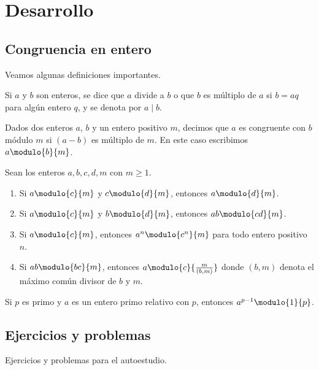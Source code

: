 \section{Desarrollo}

\subsection{Congruencia en entero}
Veamos algunas definiciones importantes.
\begin{definition}[Divisibilidad]
    Si $a$ y $b$ son enteros, se dice que $a$ divide a $b$ o que $b$ es múltiplo de $a$ si $b = aq$ para algún entero $q$,
    y se denota por $a \mid b$.
\end{definition}

\begin{definition}[Congruencias]
    Dados dos enteros $a$, $b$ y un entero positivo $m$, decimos que $a$ es congruente con $b$ módulo $m$ si $(a - b)$ es múltiplo de $m$.
    En este caso escribimos $a \modulo{b}{m}$.
\end{definition}

\begin{theorem}
    Sean los enteros $a,b,c,d,m$ con $m \geq 1$.
    \begin{enumerate}
        \item Si $a \modulo{c}{m}$ y $c \modulo{d}{m}$, entonces $a \modulo{d}{m}$.
        \item Si $a \modulo{c}{m}$ y $b \modulo{d}{m}$, entonces $ab \modulo{cd}{m}$.
        \item Si $a \modulo{c}{m}$, entonces $a^n \modulo{c^n}{m}$ para todo entero positivo $n$.
        \item Si $ab \modulo{bc}{m}$, entonces $a \modulo{c}{\frac{m}{(b,m)}}$ donde $(b,m)$ denota el máximo común divisor de $b$ y $m$.
    \end{enumerate}
\end{theorem}

\begin{theorem}
    Si $p$ es primo y $a$ es un entero primo relativo con $p$, entonces $a^{p - 1} \modulo{1}{p}$.
\end{theorem}



\subsection{Ejercicios y problemas}
Ejercicios y problemas para el autoestudio.